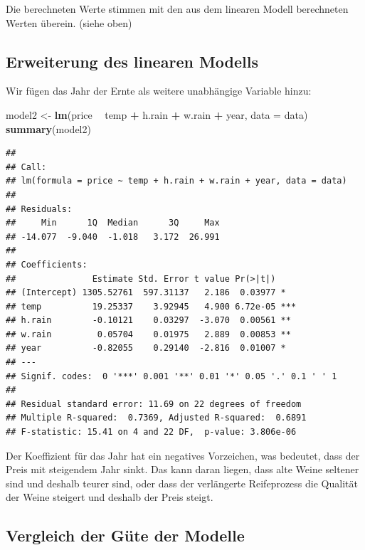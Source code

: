 \documentclass[]{article}
\newenvironment{Shaded}{\begin{snugshade}}{\end{snugshade}}
\newcommand{\DataTypeTok}[1]{\textcolor[rgb]{0.13,0.29,0.53}{#1}}
\newcommand{\KeywordTok}[1]{\textcolor[rgb]{0.13,0.29,0.53}{\textbf{#1}}}
\newcommand{\NormalTok}[1]{#1}
\newcommand{\OperatorTok}[1]{\textcolor[rgb]{0.81,0.36,0.00}{\textbf{#1}}}
\newcommand{\StringTok}[1]{\textcolor[rgb]{0.31,0.60,0.02}{#1}}
\begin{document}
Die berechneten Werte stimmen mit den aus dem linearen Modell berechneten Werten überein. (siehe oben)

\hypertarget{erweiterung-des-linearen-modells}{%
\subsection{Erweiterung des linearen Modells}\label{erweiterung-des-linearen-modells}}

Wir fügen das Jahr der Ernte als weitere unabhängige Variable hinzu:

\begin{Shaded}
\begin{Highlighting}[]
\NormalTok{model2 <-}\StringTok{ }\KeywordTok{lm}\NormalTok{(price }\OperatorTok{~}\StringTok{ }\NormalTok{temp }\OperatorTok{+}\StringTok{ }\NormalTok{h.rain }\OperatorTok{+}\StringTok{ }\NormalTok{w.rain }\OperatorTok{+}\StringTok{ }\NormalTok{year, }\DataTypeTok{data =}\NormalTok{ data)}
\KeywordTok{summary}\NormalTok{(model2)}
\end{Highlighting}
\end{Shaded}

\begin{verbatim}
## 
## Call:
## lm(formula = price ~ temp + h.rain + w.rain + year, data = data)
## 
## Residuals:
##     Min      1Q  Median      3Q     Max 
## -14.077  -9.040  -1.018   3.172  26.991 
## 
## Coefficients:
##               Estimate Std. Error t value Pr(>|t|)    
## (Intercept) 1305.52761  597.31137   2.186  0.03977 *  
## temp          19.25337    3.92945   4.900 6.72e-05 ***
## h.rain        -0.10121    0.03297  -3.070  0.00561 ** 
## w.rain         0.05704    0.01975   2.889  0.00853 ** 
## year          -0.82055    0.29140  -2.816  0.01007 *  
## ---
## Signif. codes:  0 '***' 0.001 '**' 0.01 '*' 0.05 '.' 0.1 ' ' 1
## 
## Residual standard error: 11.69 on 22 degrees of freedom
## Multiple R-squared:  0.7369, Adjusted R-squared:  0.6891 
## F-statistic: 15.41 on 4 and 22 DF,  p-value: 3.806e-06
\end{verbatim}

Der Koeffizient für das Jahr hat ein negatives Vorzeichen, was bedeutet, dass der Preis mit steigendem Jahr sinkt.
Das kann daran liegen, dass alte Weine seltener sind und deshalb teurer sind, oder dass der verlängerte Reifeprozess
die Qualität der Weine steigert und deshalb der Preis steigt.

\hypertarget{vergleich-der-guxfcte-der-modelle}{%
\subsection{Vergleich der Güte der Modelle}\label{vergleich-der-guxfcte-der-modelle}}
\end{document}
